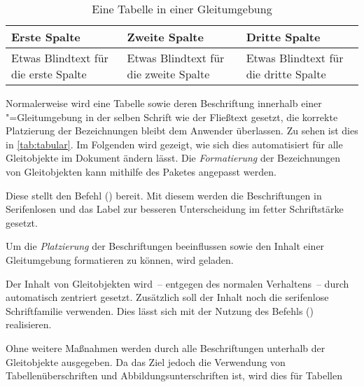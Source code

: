 \documentclass[%
  english,ngerman,%
  cdgeometry=no,DIV=12,%
  cd=false,cdfont=false,cdtitle=true,%
  headings=normal,%
  automark,%
  listof=toc,%
]{tudscrartcl}
\begin{document}
\newcommand*\tableexample[1][]{%
  \begin{tabularx}{.75\textwidth}{@{}XXX@{}}
  \toprule
  \textbf{Erste Spalte} & \textbf{Zweite Spalte} & 
  \textbf{Dritte Spalte} \tabularnewline\midrule
  Etwas Blindtext für die erste Spalte &
  Etwas Blindtext für die zweite Spalte &
  Etwas Blindtext für die dritte Spalte
  \tabularnewline\bottomrule
  \end{tabularx}
  #1%
}
\begin{table}
\tableexample[%
  \caption{Eine Tabelle in einer Gleitumgebung}\label{tab:tabular}%
]
\end{table}

Normalerweise wird eine Tabelle sowie deren Beschriftung innerhalb einer 
"=Gleitumgebung in der selben Schrift wie der Fließtext 
gesetzt, die korrekte Platzierung der Bezeichnungen bleibt dem Anwender 
überlassen. Zu sehen ist dies in \autoref{tab:tabular}. Im Folgenden wird 
gezeigt, wie sich dies automatisiert für alle Gleitobjekte im Dokument ändern 
lässt. Die \emph{Formatierung} der Bezeichnungen von Gleitobjekten kann 
mithilfe des Paketes  angepasst werden.
%
\begin{Preamble}
\usepackage{caption}
\end{Preamble}
%
Diese stellt den Befehl () bereit. Mit 
diesem werden die Beschriftungen in Serifenlosen und das Label zur besseren 
Unterscheidung im fetter Schriftstärke gesetzt.
%
\begin{Preamble*}
\captionsetup{font=sf,labelfont=bf,labelsep=space}
\end{Preamble*}
%
Um die \emph{Platzierung} der Beschriftungen beeinflussen sowie den Inhalt 
einer Gleitumgebung formatieren zu können, wird  geladen. 
\begin{Preamble}
\usepackage{floatrow}
\end{Preamble}
%
Der Inhalt von Gleitobjekten wird~-- entgegen des normalen Verhaltens~-- durch 
 automatisch zentriert gesetzt. Zusätzlich soll der Inhalt 
noch die serifenlose Schriftfamilie verwenden. Dies lässt sich mit der Nutzung 
des Befehls () realisieren.
%
\begin{Preamble*}
\end{Preamble*}
%
Ohne weitere Maßnahmen werden durch  alle Beschriftungen 
unterhalb der Gleitobjekte ausgegeben. Da das Ziel jedoch die Verwendung von 
Tabellenüberschriften und Abbildungsunterschriften ist, wird dies für Tabellen
\end{document}
